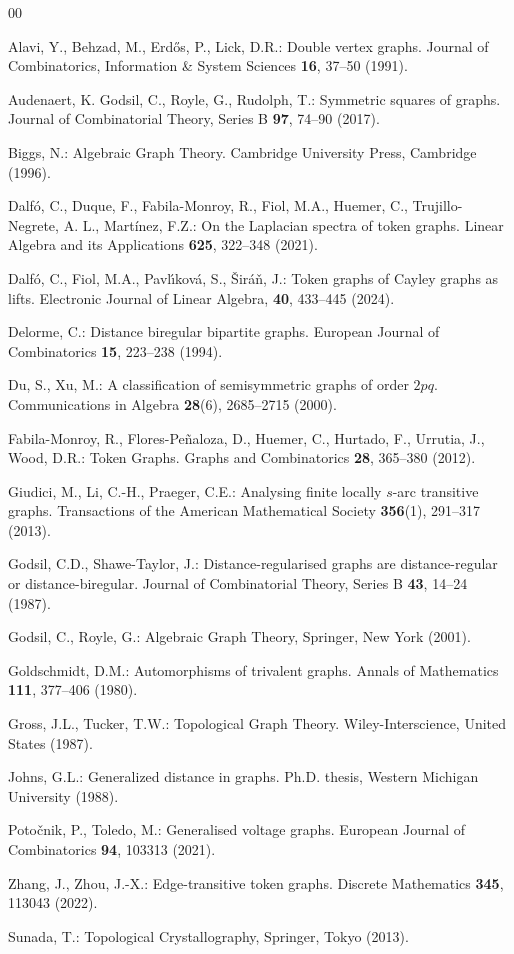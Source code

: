 \documentclass[letterpaper,10pt]{article}
\theoremstyle{plain}
\theoremstyle{definition}
\begin{document}


\begin{thebibliography}{00}

 Alavi, Y., Behzad, M.,  Erd\H{o}s, P., Lick, D.R.:  Double vertex graphs.  Journal of Combinatorics, Information \& System Sciences {\bf 16}, 37--50 (1991).

 Audenaert, K. Godsil, C., Royle, G., Rudolph, T.:
Symmetric squares of graphs. 
Journal of Combinatorial Theory, Series B 
{\bf 97}, 74--90 (2017).

 Biggs, N.: Algebraic Graph Theory.  Cambridge University Press, Cambridge (1996).

 Dalf\'o, C., Duque, F., Fabila-Monroy, R., Fiol, M.A.,  Huemer, C., Trujillo-Negrete, A. L.,  Mart\'inez, F.Z.: On the Laplacian spectra of
token graphs. Linear Algebra and its Applications {\bf 625}, 322--348 (2021).

 Dalf\'o, C., Fiol, M.A., Pavl{\'\i}kov{\'a}, S., {\v{S}}ir{\'a}{\v{n}}, J.:
Token graphs of Cayley graphs as lifts. 
Electronic Journal of Linear Algebra, {\bf 40}, 433--445 (2024).


 Delorme, C.: Distance biregular bipartite graphs. European Journal of Combinatorics {\bf 15}, 223--238 (1994).

 Du, S., Xu, M.: A classification of semisymmetric graphs of order $2pq$. Communications in Algebra \textbf{28}(6), 2685--2715 (2000).

 Fabila-Monroy, R., Flores-Peñaloza, D., Huemer, C., Hurtado, F., Urrutia, J., Wood, D.R.: Token Graphs. Graphs and Combinatorics \textbf{28}, 365--380 (2012).


 Giudici, M., Li, C.-H., Praeger, C.E.: Analysing finite locally $s$-arc transitive graphs. Transactions of the American Mathematical Society \textbf{356}(1), 291--317 (2013). 


 Godsil, C.D., Shawe-Taylor, J.: Distance-regularised graphs are distance-regular or distance-biregular. Journal of Combinatorial Theory, Series B {\bf 43}, 14--24 (1987).

  Godsil, C., Royle, G.: Algebraic Graph Theory, Springer, New York (2001).

 Goldschmidt, D.M.: Automorphisms of trivalent graphs. Annals of Mathematics \textbf{111}, 377--406 (1980).

 Gross, J.L., Tucker, T.W.: Topological Graph Theory. Wiley-Interscience, United States (1987).

 Johns, G.L.:  Generalized distance in graphs. Ph.D. thesis, Western Michigan University (1988).

 Poto\v{c}nik, P., Toledo, M.: Generalised voltage graphs. European Journal of Combinatorics {\bf 94}, 103313 (2021).

 Zhang, J., Zhou, J.-X.: Edge-transitive token graphs. Discrete Mathematics \textbf{345}, 113043 (2022).

  Sunada, T.: Topological Crystallography, Springer, Tokyo (2013).

 \end{thebibliography}
\end{document}
